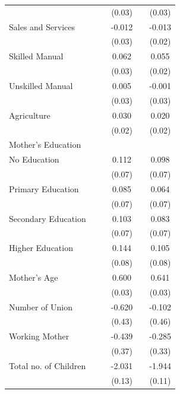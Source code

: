\begin{longtable}{l*{5}{c}}
                    & & & (0.03) & & (0.03) \\
\hspace{1em}Sales and Services & & & -0.012 & & -0.013 \\
                    & & & (0.03) & & (0.02) \\
\hspace{1em}Skilled Manual & & & 0.062\sym{**} & & 0.055\sym{***} \\
                    & & & (0.03) & & (0.02) \\
\hspace{1em}Unskilled Manual & & & 0.005 & & -0.001 \\
                    & & & (0.03) & & (0.03) \\
\hspace{1em}Agriculture & & & 0.030 & & 0.020 \\
                    & & & (0.02) & & (0.02) \\
\multicolumn{6}{l}{Mother's Education} \\
\hspace{1em}No Education & & & 0.112 & & 0.098 \\
                    & & & (0.07) & & (0.07) \\
\hspace{1em}Primary Education & & & 0.085 & & 0.064 \\
                    & & & (0.07) & & (0.07) \\
\hspace{1em}Secondary Education & & & 0.103 & & 0.083 \\
                    & & & (0.07) & & (0.07) \\
\hspace{1em}Higher Education & & & 0.144\sym{*} & & 0.105 \\
                    & & & (0.08) & & (0.08) \\
Mother's Age & & & 0.600\sym{***} & & 0.641\sym{***} \\
                    & & & (0.03) & & (0.03) \\
Number of Union & & & -0.620 & & -0.102 \\
                    & & & (0.43) & & (0.46) \\
Working Mother & & & -0.439 & & -0.285 \\
                    & & & (0.37) & & (0.33) \\
Total no. of Children & & & -2.031\sym{***} & & -1.944\sym{***} \\
                    & & & (0.13) & & (0.11) \\

\end{longtable}

